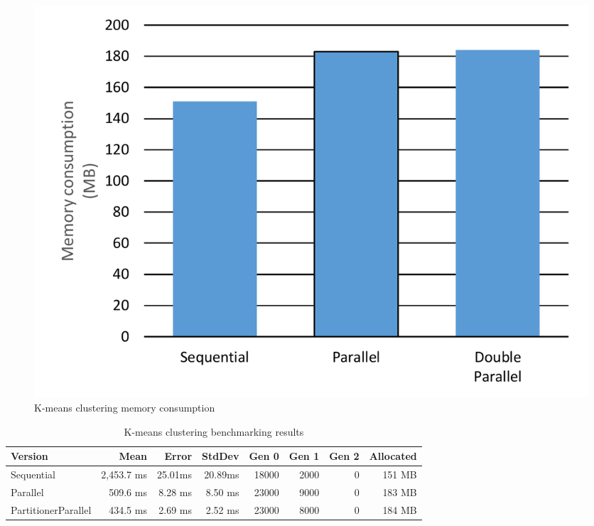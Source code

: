 \begin{figure}[htb]
\centering
\includegraphics[width=.8\linewidth]{figures04/KMeansMemory.pdf}
\caption{K-means clustering memory consumption}
\label{fig: KMeansMemory}
\end{figure}

\begin{table}[ht]%
    \centering
    \caption{K-means clustering benchmarking results}
		\label{tab: KMeansBenchmarking}
    \begin{tabularx}{\linewidth}{Xrrrrrrr} \toprule
			\bfseries Version 	&
			\bfseries Mean    	&
			\bfseries Error	    &
			\bfseries StdDev	  &
			\bfseries Gen 0	    &
			\bfseries Gen 1	    &
			\bfseries Gen 2	    &
			\bfseries Allocated \\ 
			\midrule 
Sequential & 2,453.7 ms	& 25.01ms	& 20.89ms	& 18000 & 	2000 & 	0 & 151 MB \\
Parallel & 509.6 ms	& 8.28 ms	& 8.50 ms	& 23000 & 	9000 & 	0 & 183 MB \\ 
PartitionerParallel & 434.5 ms	& 2.69 ms	& 2.52 ms	& 23000 & 	8000 & 	0 & 
184 MB \\
			\bottomrule
		\end{tabularx}
\end{table}
	
\clearpage
